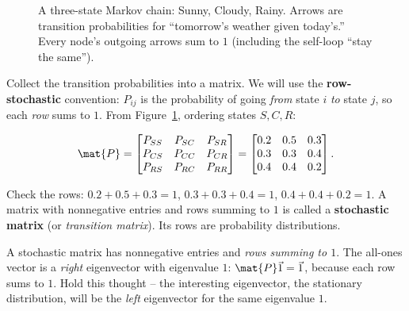 \begin{figure}[H]
\centering
{}
\caption{A three-state Markov chain: Sunny, Cloudy, Rainy. Arrows are transition
probabilities for ``tomorrow's weather given today's.'' Every node's outgoing arrows sum to
$1$ (including the self-loop ``stay the same'').}
\label{ch35:fig-markov}
\end{figure}

Collect the transition probabilities into a matrix. We will use the \textbf{row-stochastic}
convention: $P_{ij}$ is the probability of going \emph{from} state $i$ \emph{to} state $j$,
so each \emph{row} sums to $1$. From Figure~\ref{ch35:fig-markov}, ordering states
$S,C,R$:

\[
\mat{P} =
\begin{bmatrix}
P_{SS} & P_{SC} & P_{SR}\\
P_{CS} & P_{CC} & P_{CR}\\
P_{RS} & P_{RC} & P_{RR}
\end{bmatrix}
=
\begin{bmatrix}
0.2 & 0.5 & 0.3\\
0.3 & 0.3 & 0.4\\
0.4 & 0.4 & 0.2
\end{bmatrix}.
\]

Check the rows: $0.2+0.5+0.3 = 1$, $0.3+0.3+0.4=1$, $0.4+0.4+0.2=1$. A matrix with
nonnegative entries and rows summing to $1$ is called a \textbf{stochastic matrix} (or
\emph{transition matrix}). Its rows are probability distributions.

\begin{focusbox}
A stochastic matrix has nonnegative entries and \emph{rows summing to $1$}. The all-ones
vector is a \emph{right} eigenvector with eigenvalue $1$: $\mat{P}\vec{1} = \vec{1}$, because
each row sums to $1$. Hold this thought -- the interesting eigenvector, the stationary
distribution, will be the \emph{left} eigenvector for the same eigenvalue $1$.
\end{focusbox}

